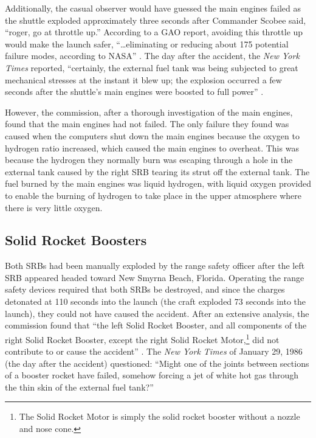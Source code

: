 Additionally, the casual observer would have guessed the main engines failed as the shuttle exploded approximately three seconds after Commander Scobee said, ``roger, go at throttle up.'' According to a GAO report, avoiding this throttle up would make the launch safer, ``\ldots eliminating or reducing about 175 potential failure modes, according to NASA'' \cite{gao89}. The day after the accident, the {\em New York Times} reported, ``certainly, the external fuel tank was being subjected to great mechanical stresses at the instant it blew up; the explosion occurred a few seconds after the shuttle's main engines were boosted to full power'' \cite[p. A4]{nytexternal}.

However, the commission, after a thorough investigation of the main engines, found that the main engines had not failed. The only failure they found was caused when the computers shut down the main engines because the oxygen to hydrogen ratio increased, which caused the main engines to overheat. This was because the hydrogen they normally burn was escaping through a hole in the external tank caused by the right SRB tearing its strut off the external tank. The fuel burned by the main engines was liquid hydrogen, with liquid oxygen provided to enable the burning of hydrogen to take place in the upper atmosphere where there is very little oxygen.

\subsection{Solid Rocket Boosters}

Both SRBs had been manually exploded by the range safety officer after the left SRB appeared headed toward New Smyrna Beach, Florida. Operating the range safety devices required that both SRBs be destroyed, and since the charges detonated at 110 seconds into the launch (the craft exploded 73 seconds into the launch), they could not have caused the accident. After an extensive analysis, the commission found that ``the left Solid Rocket Booster, and all components of the right Solid Rocket Booster, except the right Solid Rocket Motor,\footnote{The Solid Rocket Motor is simply the solid rocket booster without a nozzle and nose cone.} did not contribute to or cause the accident'' \cite[vol 1, p. 53]{rogers}. The {\em New York Times} of January 29, 1986 (the day after the accident) questioned: ``Might one of the joints between sections of a booster rocket have failed, somehow forcing a jet of white hot gas through the thin skin of the external fuel tank?'' \cite{nytexternal}

